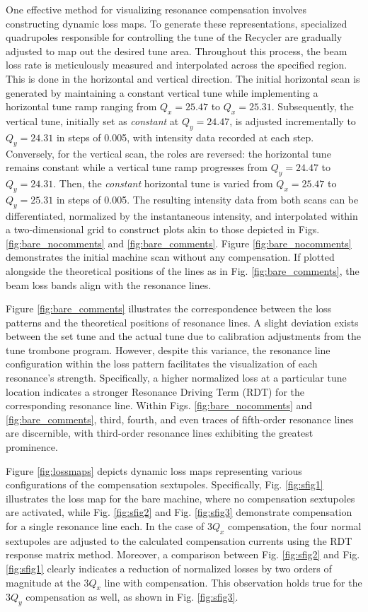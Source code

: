 One effective method for visualizing resonance compensation involves constructing dynamic loss maps. To generate these representations, specialized quadrupoles responsible for controlling the tune of the Recycler are gradually adjusted to map out the desired tune area. Throughout this process, the beam loss rate is meticulously measured and interpolated across the specified region. This is done in the horizontal and vertical direction. The initial horizontal scan is generated by maintaining a constant vertical tune while implementing a horizontal tune ramp ranging from $Q_x=25.47$ to $Q_x=25.31$. Subsequently, the vertical tune, initially set as \textit{constant} at $Q_y=24.47$, is adjusted incrementally to $Q_y=24.31$ in steps of 0.005, with intensity data recorded at each step. Conversely, for the vertical scan, the roles are reversed: the horizontal tune remains constant while a vertical tune ramp progresses from $Q_y=24.47$ to $Q_y=24.31$. Then, the \textit{constant} horizontal tune is varied from $Q_x=25.47$ to $Q_y=25.31$ in steps of 0.005. The resulting intensity data from both scans can be differentiated, normalized by the instantaneous intensity, and interpolated within a two-dimensional grid to construct plots akin to those depicted in Figs. \ref{fig:bare_nocomments} and \ref{fig:bare_comments}. Figure \ref{fig:bare_nocomments} demonstrates the initial machine scan without any compensation. If plotted alongside the theoretical positions of the lines as in Fig. \ref{fig:bare_comments}, the beam loss bands align with the resonance lines. 

Figure \ref{fig:bare_comments} illustrates the correspondence between the loss patterns and the theoretical positions of resonance lines. A slight deviation exists between the set tune and the actual tune due to calibration adjustments from the tune trombone program. However, despite this variance, the resonance line configuration within the loss pattern facilitates the visualization of each resonance's strength. Specifically, a higher normalized loss at a particular tune location indicates a stronger Resonance Driving Term (RDT) for the corresponding resonance line. Within Figs. \ref{fig:bare_nocomments} and \ref{fig:bare_comments}, third, fourth, and even traces of fifth-order resonance lines are discernible, with third-order resonance lines exhibiting the greatest prominence.

Figure \ref{fig:lossmaps} depicts dynamic loss maps representing various configurations of the compensation sextupoles. Specifically, Fig. \ref{fig:sfig1} illustrates the loss map for the bare machine, where no compensation sextupoles are activated, while Fig. \ref{fig:sfig2} and Fig. \ref{fig:sfig3} demonstrate compensation for a single resonance line each. In the case of $3Q_x$ compensation, the four normal sextupoles are adjusted to the calculated compensation currents using the RDT response matrix method. Moreover, a comparison between Fig. \ref{fig:sfig2} and Fig. \ref{fig:sfig1} clearly indicates a reduction of normalized losses by two orders of magnitude at the $3Q_x$ line with compensation. This observation holds true for the $3Q_y$ compensation as well, as shown in Fig. \ref{fig:sfig3}.

